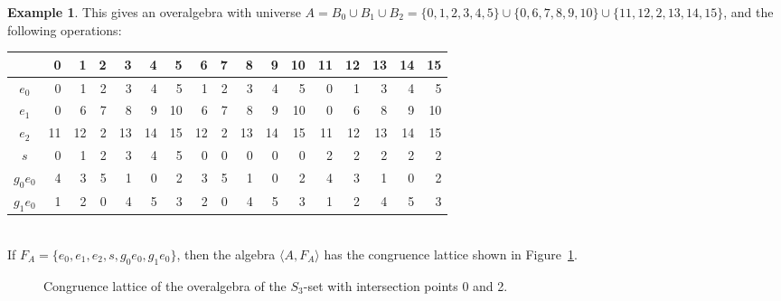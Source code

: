 \documentclass[cm,dissertation,actual,final]{uhthesis}
\theoremstyle{plain}
\theoremstyle{definition}
\newtheorem{example}[theorem]{Example}
\theoremstyle{remark}
\numberwithin{theorem}{section}
\numberwithin{claim}{chapter}
\numberwithin{equation}{section}
\numberwithin{conjecture}{chapter}
\newcommand{\<}{\ensuremath{\langle}}
\renewcommand{\>}{\ensuremath{\rangle}}
\newcommand{\0}{\ensuremath{\mathbf{0}}}
\newcommand{\1}{\ensuremath{\mathbf{1}}}
\newcommand{\2}{\ensuremath{\mathbf{2}}}
\newcommand{\3}{\ensuremath{\mathbf{3}}}
\newcommand{\4}{\ensuremath{\mathbf{4}}}
\newcommand{\5}{\ensuremath{\mathbf{5}}}
\begin{document}
\begin{example}
  \noindent This gives an
  overalgebra with universe $A = B_0 \cup B_1 \cup B_2 = \{ 0, 1, 2, 3, 4, 5\} \cup
  \{0, 6, 7, 8, 9, 10\} \cup\{ 11, 12, 2, 13, 14, 15\}$,
  and the following operations:
  \\[-5pt]
  \begin{center}
    {\small 
      \begin{tabular}{c|r|r|r|r|r|r|r|r|r|r|r|r|r|r|r|r}
        &0&1&2&3&4&5&6&7&8&9&10&11&12&13&14&15\\
        \hline
        $e_0$ & 0& 1& 2& 3& 4& 5& 1& 2& 3& 4& 5& 0& 1& 3& 4& 5\\
        $e_1$ & 0& 6& 7& 8& 9& 10& 6& 7& 8& 9& 10& 0& 6& 8& 9& 10\\
        $e_2$ &11& 12& 2& 13& 14& 15& 12& 2& 13& 14& 15& 11& 12& 13& 14& 15\\
        $s$  & 0& 1& 2& 3& 4& 5& 0& 0& 0& 0& 0& 2& 2& 2& 2& 2\\
        $g_0 e_0$ &4& 3& 5& 1& 0& 2& 3& 5& 1& 0& 2& 4& 3& 1& 0& 2\\
        $g_1 e_0$& 1& 2& 0& 4& 5& 3& 2& 0& 4& 5& 3& 1& 2& 4& 5& 3
    \end{tabular}}
  \end{center}
  ~\\[4pt]
  \noindent If %
  $F_A=\{e_0, e_1, e_2, s, g_0 e_0, g_1 e_0\}$, then the
  algebra $\<A, F_A\>$ has the congruence lattice shown in Figure~\ref{fig:OverAlgebra-S3-0-2}.
  \begin{figure}[h!]
    \centering
    \caption{Congruence lattice of the overalgebra of the $S_3$-set with
      intersection points 0 and 2.}
    \label{fig:OverAlgebra-S3-0-2}
  \end{figure}


\end{example}
\end{document}
